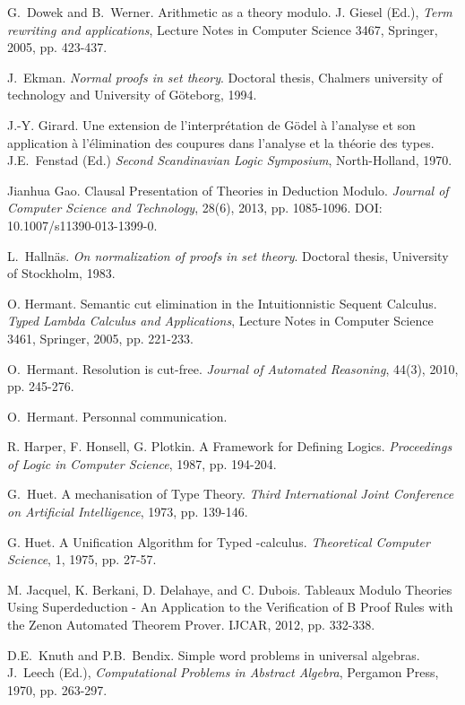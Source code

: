 \documentclass{llncs}
\begin{document}
\begin{thebibliography}{99.}
G.~Dowek and B.~Werner. 
Arithmetic as a theory modulo. 
J. Giesel (Ed.), {\em Term rewriting and applications}, 
Lecture Notes in Computer Science 3467, Springer, 2005, pp. 423-437. 

J.~Ekman.
{\em Normal proofs in set theory}. 
Doctoral thesis, Chalmers university of technology and University 
of G\"{o}teborg, 1994.

J.-Y. Girard.
Une extension de l'interpr\'etation de G\"odel \`a
l'analyse et son application \`a l'\'elimination des coupures dans
l'analyse et la th\'eorie des types.
J.E.~Fenstad (Ed.)  {\em Second Scandinavian Logic Symposium}, 
North-Holland, 1970.

Jianhua Gao.
Clausal Presentation of Theories in Deduction Modulo.
{\em Journal of Computer Science and Technology}, 28(6), 
2013, pp. 1085-1096. DOI: 10.1007/s11390-013-1399-0. 

L.~Halln\"{a}s.
{\em On normalization of proofs in set theory}.
Doctoral thesis, University of Stockholm, 1983.

O. Hermant.
Semantic cut elimination in the Intuitionnistic Sequent Calculus.
{\em Typed Lambda Calculus and Applications}, 
Lecture Notes in Computer Science 3461, Springer, 2005, pp. 221-233.

O.~Hermant.
Resolution is cut-free.
{\em Journal of Automated Reasoning}, 44(3), 2010, pp. 245-276.

O.~Hermant. Personnal communication.

R. Harper, F. Honsell, G. Plotkin.
A Framework for Defining Logics.
{\it Proceedings of Logic in Computer Science}, 1987, pp. 194-204.

G.~Huet.
A mechanisation of Type Theory.
{\em Third International Joint Conference on Artificial Intelligence}, 
1973,  pp. 139-146.

G. Huet.
A Unification Algorithm for Typed -calculus.
{\em Theoretical Computer Science}, 1, 1975, pp. 27-57.

M. Jacquel, K. Berkani, D. Delahaye, and C. Dubois.
Tableaux Modulo Theories Using Superdeduction - An Application to the 
Verification of B Proof Rules with the Zenon Automated Theorem Prover.
IJCAR, 2012, pp. 332-338.

D.E.~Knuth and P.B.~Bendix.
Simple word problems in universal algebras.
J.~Leech (Ed.), {\em Computational Problems in Abstract
Algebra}, Pergamon Press, 1970, pp. 263-297. 


\end{thebibliography}
\end{document}
